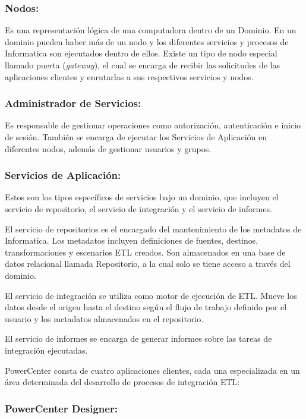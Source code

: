 \subsubsection{Nodos:} 

Es una representación lógica de una computadora dentro de un Dominio. En un dominio pueden haber m\'as de un nodo y 
los diferentes servicios y procesos de Informatica son ejecutados dentro de ellos. Existe un tipo de nodo especial 
llamado puerta (\emph{gateway}), el cual se encarga de recibir las solicitudes de las aplicaciones clientes y enrutarlas a sus 
respectivos servicios y nodos.

\subsubsection{Administrador de Servicios:} 

Es responsable de gestionar operaciones como autorización, autenticación e inicio de sesión. También se encarga de 
ejecutar los Servicios de Aplicaci\'on en diferentes nodos, además de gestionar usuarios y grupos.

\subsubsection{Servicios de Aplicaci\'on:}

Estos son los tipos específicos de servicios bajo un dominio, que incluyen el servicio de repositorio, el servicio de 
integración y el servicio de informes.

El servicio de repositorios es el encargado del mantenimiento de los metadatos de Informatica. Los metadatos incluyen 
definiciones de fuentes, destinos, transformaciones y escenarios ETL creados. Son almacenados en una base de datos 
relacional llamada Repositorio, a la cual solo se tiene acceso a través del dominio.

El servicio de integración se utiliza como motor de ejecución de ETL. Mueve los datos desde el origen hasta el 
destino según el flujo de trabajo definido por el usuario y los metadatos almacenados en el repositorio.

El servicio de informes se encarga de generar informes sobre las tareas de integración ejecutadas.


PowerCenter consta de cuatro aplicaciones clientes, cada una especializada en un \'area determinada del 
desarrollo de procesos de integración ETL:

\subsubsection{PowerCenter Designer:}

